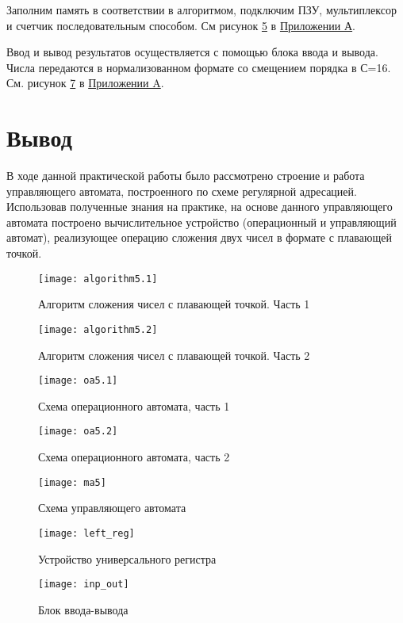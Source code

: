 \documentclass[a4paper,14pt]{extarticle}
\begin{document}
Заполним память в соответствии в алгоритмом, подключим ПЗУ, мультиплексор и счетчик последовательным способом. См рисунок \ref{img:ma} в \hyperref[tam]{Приложении А}. 

Ввод и вывод результатов осуществляется с помощью блока ввода и вывода. Числа передаются в нормализованном формате со смещением порядка в С=16. См. рисунок \ref{img:inp_out} в \hyperref[tam]{Приложении A}.


\section {Вывод}
В ходе данной практической работы было рассмотрено строение и работа управляющего автомата, построенного по схеме регулярной адресацией. Использовав полученные знания на практике, на основе данного управляющего автомата построено вычислительное устройство (операционный и управляющий автомат), реализующее операцию сложения двух чисел в формате с плавающей точкой.

\label{tam}
\begin{figure}[h!]
	\centering
	\texttt{[image: algorithm5.1]}
	\caption {Алгоритм сложения чисел с плавающей точкой. Часть 1}
	\label{img:algorithm}
\end{figure}
\newpage
\begin{figure}[htpb]
	\centering
	\texttt{[image: algorithm5.2]}
	\caption {Алгоритм сложения чисел с плавающей точкой. Часть 2}
	\label{img:algorithm2}
\end{figure}
\newpage
\begin{figure}[htpb]
	\centering
	\texttt{[image: oa5.1]}
	\caption {Схема операционного автомата, часть 1}
	\label{img:oa1}
\end{figure}
\begin{figure}[htbp]
	\centering
	\texttt{[image: oa5.2]}
	\caption {Схема операционного автомата, часть 2}
	\label{img:oa2}
\end{figure}

\begin{figure}[htbp]
	\centering
	\texttt{[image: ma5]}
	\caption {Схема управляющего автомата}
	\label{img:ma}
\end{figure}

\begin{figure}[htbp]
	\centering
	\texttt{[image: left\_reg]}
	\caption {Устройство универсального регистра}
	\label{img:left_reg}
\end{figure}

\begin{figure}[htbp]
	\centering
	\texttt{[image: inp\_out]}
	\caption {Блок ввода-вывода}
	\label{img:inp_out}
\end{figure}
\end{document}
